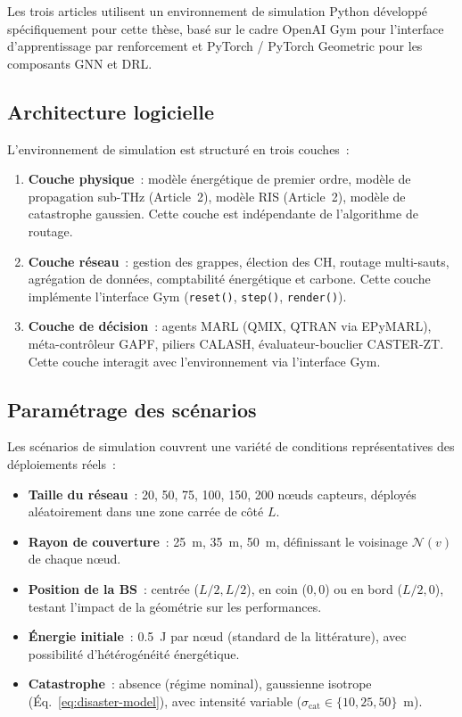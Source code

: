 Les trois articles utilisent un environnement de simulation Python développé spécifiquement pour cette thèse, basé sur le cadre OpenAI Gym \cite{brockman2016gym} pour l'interface d'apprentissage par renforcement et PyTorch / PyTorch Geometric pour les composants GNN et DRL.

\subsection{Architecture logicielle}

L'environnement de simulation est structuré en trois couches~:
\begin{enumerate}
    \item \textbf{Couche physique}~: modèle énergétique de premier ordre, modèle de propagation sub-THz (Article~2), modèle RIS (Article~2), modèle de catastrophe gaussien. Cette couche est indépendante de l'algorithme de routage.
    \item \textbf{Couche réseau}~: gestion des grappes, élection des CH, routage multi-sauts, agrégation de données, comptabilité énergétique et carbone. Cette couche implémente l'interface Gym (\texttt{reset()}, \texttt{step()}, \texttt{render()}).
    \item \textbf{Couche de décision}~: agents MARL (QMIX, QTRAN via EPyMARL), méta-contrôleur GAPF, piliers CALASH, évaluateur-bouclier CASTER-ZT. Cette couche interagit avec l'environnement via l'interface Gym.
\end{enumerate}

\subsection{Paramétrage des scénarios}

Les scénarios de simulation couvrent une variété de conditions représentatives des déploiements réels~:
\begin{itemize}
    \item \textbf{Taille du réseau}~: 20, 50, 75, 100, 150, 200 n\oe{}uds capteurs, déployés aléatoirement dans une zone carrée de côté $L$.
    \item \textbf{Rayon de couverture}~: 25~m, 35~m, 50~m, définissant le voisinage $\mathcal{N}(v)$ de chaque n\oe{}ud.
    \item \textbf{Position de la BS}~: centrée ($L/2, L/2$), en coin ($0, 0$) ou en bord ($L/2, 0$), testant l'impact de la géométrie sur les performances.
    \item \textbf{Énergie initiale}~: 0.5~J par n\oe{}ud (standard de la littérature), avec possibilité d'hétérogénéité énergétique.
    \item \textbf{Catastrophe}~: absence (régime nominal), gaussienne isotrope (Éq.~\ref{eq:disaster-model}), avec intensité variable ($\sigma_{\text{cat}} \in \{10, 25, 50\}$~m).
\end{itemize}

